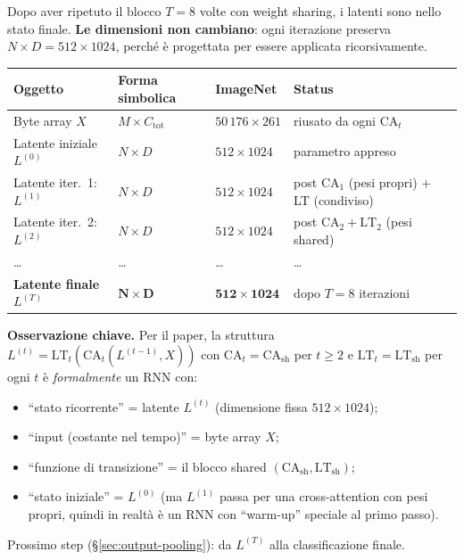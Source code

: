 \documentclass[
  11pt,
]{article}
\begin{document}
\begin{notabox}[title={\textbf{Checkpoint dimensioni --- fine \S1.4.11 (dopo $T = 8$ iterazioni)}}]
Dopo aver ripetuto il blocco $T = 8$ volte con weight sharing, i latenti sono nello stato finale. \textbf{Le dimensioni non cambiano}: ogni iterazione preserva $N \times D = 512 \times 1024$, perché è progettata per essere applicata ricorsivamente.

\medskip
\begin{center}
\begin{tabular}{@{}llll@{}}
\toprule
\textbf{Oggetto} & \textbf{Forma simbolica} & \textbf{ImageNet} & \textbf{Status} \\
\midrule
Byte array $X$ & $M \times C_{\text{tot}}$ & $50\,176 \times 261$ & riusato da ogni $\text{CA}_t$ \\
Latente iniziale $L^{(0)}$ & $N \times D$ & $512 \times 1024$ & parametro appreso \\
Latente iter.\ 1: $L^{(1)}$ & $N \times D$ & $512 \times 1024$ & post $\text{CA}_1$ (pesi propri) $+$ LT (condiviso) \\
Latente iter.\ 2: $L^{(2)}$ & $N \times D$ & $512 \times 1024$ & post $\text{CA}_2 + \text{LT}_2$ (pesi shared) \\
\dots & \dots & \dots & \dots \\
\textbf{Latente finale $L^{(T)}$} & $\boldsymbol{N \times D}$ & $\mathbf{512 \times 1024}$ & dopo $T=8$ iterazioni \\
\bottomrule
\end{tabular}
\end{center}

\medskip
\textbf{Osservazione chiave.} Per il paper, la struttura $L^{(t)} = \text{LT}_t(\text{CA}_t(L^{(t-1)}, X))$ con $\text{CA}_t = \text{CA}_{\text{sh}}$ per $t \geq 2$ e $\text{LT}_t = \text{LT}_{\text{sh}}$ per ogni $t$ è \emph{formalmente} un RNN con:
\begin{itemize}\setlength\itemsep{0.1em}
\item ``stato ricorrente'' = latente $L^{(t)}$ (dimensione fissa $512 \times 1024$);
\item ``input (costante nel tempo)'' = byte array $X$;
\item ``funzione di transizione'' = il blocco shared $(\text{CA}_{\text{sh}}, \text{LT}_{\text{sh}})$;
\item ``stato iniziale'' = $L^{(0)}$ (ma $L^{(1)}$ passa per una cross-attention con pesi propri, quindi in realtà è un RNN con ``warm-up'' speciale al primo passo).
\end{itemize}

\medskip
Prossimo step (\S\ref{sec:output-pooling}): da $L^{(T)}$ alla classificazione finale.
\end{notabox}
\end{document}
